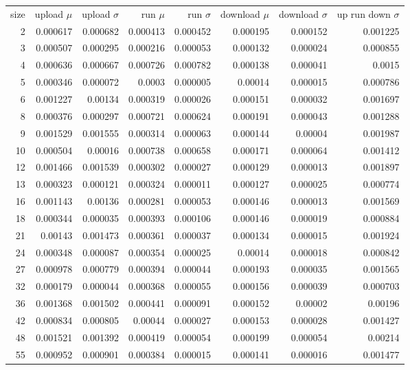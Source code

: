 \begin{longtable}{r r r r r r r r}
size & upload $\mu$  & upload $\sigma$ & run $\mu$ & run $\sigma$ & download $\mu$ & download $\sigma$ & up run down $\sigma$ \\
2 & 0.000617 & 0.000682 & 0.000413 & 0.000452 & 0.000195 & 0.000152 & 0.001225 \\
3 & 0.000507 & 0.000295 & 0.000216 & 0.000053 & 0.000132 & 0.000024 & 0.000855 \\
4 & 0.000636 & 0.000667 & 0.000726 & 0.000782 & 0.000138 & 0.000041 & 0.0015 \\
5 & 0.000346 & 0.000072 & 0.0003 & 0.000005 & 0.00014 & 0.000015 & 0.000786 \\
6 & 0.001227 & 0.00134 & 0.000319 & 0.000026 & 0.000151 & 0.000032 & 0.001697 \\
8 & 0.000376 & 0.000297 & 0.000721 & 0.000624 & 0.000191 & 0.000043 & 0.001288 \\
9 & 0.001529 & 0.001555 & 0.000314 & 0.000063 & 0.000144 & 0.00004 & 0.001987 \\
10 & 0.000504 & 0.00016 & 0.000738 & 0.000658 & 0.000171 & 0.000064 & 0.001412 \\
12 & 0.001466 & 0.001539 & 0.000302 & 0.000027 & 0.000129 & 0.000013 & 0.001897 \\
13 & 0.000323 & 0.000121 & 0.000324 & 0.000011 & 0.000127 & 0.000025 & 0.000774 \\
16 & 0.001143 & 0.00136 & 0.000281 & 0.000053 & 0.000146 & 0.000013 & 0.001569 \\
18 & 0.000344 & 0.000035 & 0.000393 & 0.000106 & 0.000146 & 0.000019 & 0.000884 \\
21 & 0.00143 & 0.001473 & 0.000361 & 0.000037 & 0.000134 & 0.000015 & 0.001924 \\
24 & 0.000348 & 0.000087 & 0.000354 & 0.000025 & 0.00014 & 0.000018 & 0.000842 \\
27 & 0.000978 & 0.000779 & 0.000394 & 0.000044 & 0.000193 & 0.000035 & 0.001565 \\
32 & 0.000179 & 0.000044 & 0.000368 & 0.000055 & 0.000156 & 0.000039 & 0.000703 \\
36 & 0.001368 & 0.001502 & 0.000441 & 0.000091 & 0.000152 & 0.00002 & 0.00196 \\
42 & 0.000834 & 0.000805 & 0.00044 & 0.000027 & 0.000153 & 0.000028 & 0.001427 \\
48 & 0.001521 & 0.001392 & 0.000419 & 0.000054 & 0.000199 & 0.000054 & 0.00214 \\
55 & 0.000952 & 0.000901 & 0.000384 & 0.000015 & 0.000141 & 0.000016 & 0.001477 \\

\end{longtable}
